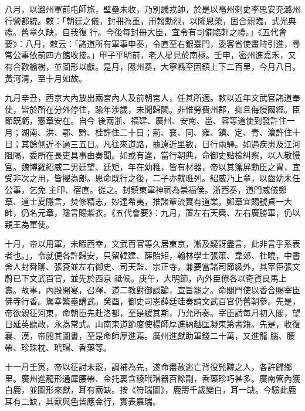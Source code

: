 \begin{pinyinscope}
 八月，以潞州軍前屯師旅，壁壘未收，乃別議戎帥，於是以亳州刺史李思安充潞州行營都統。敕：「朝廷之儀，封冊為重，用報勳烈，以隆恩榮，固合親臨，式光典禮。舊章久缺，自我復
 行。今後每封冊大臣，宜令有司備臨軒之禮。」《五代會要》：八月，敕云：「諸道所有軍事申奏，令直至右銀臺門，委客省使畫時引進，尋常公事依前四方館收接。」甲子平明前，老人星見於南極。壬申，密州進嘉禾，又有合歡榆樹，並圖形以獻。是月，隰州奏，大寧縣至固鎮上下二百里，今月八日，黃河清，至十月如故。



 九月辛丑，西京大內放出兩宮內人及前朝宮人，任其所適。敕以近年文武官諸道奉使，皆於所在分外停住，踰年涉歲，未聞歸闕。非惟勞費州郡，抑且侮慢國經。臣節既虧，憲章安在。自今
 後兩浙、福建、廣州、安南、邕、容等道使到發許住一月；湖南、洪、鄂、黔、桂許住二十日；荊、襄、同、雍、鎮、定、青、滄許住十日；其餘側近不過三五日。凡往來道路，據遠近里數，日行兩驛。如遇疾患及江河阻隔，委所在長吏具事由奏聞。如或有違，當行朝典，命御史點檢糾察，以人敬慢官。魏博羅紹威二男廷望、廷矩，年在幼稚，皆有材器，帝以其籓屏勳臣之胄，宜受非次之用，皆擢為郎。恩命既行之後，二子亦就班列。紹威乃上章，以齒幼未任公事，乞免
 主印、宿直。從之。封鎮東軍神祠為崇福侯。浙西奏，道門威儀鄭章、道士夏隱言，焚修精志，妙達希夷，推諸輩流實有道業。鄭章宜賜號貞一大師，仍名元章，隱言賜紫衣。《五代會要》：九月，置左右天興、左右廣勝軍，仍以親王為軍使。



 十月，帝以用軍，未暇西幸，文武百官等久居東京，漸及疑訝盡言，此非言乎系表者也。」，令就便各許歸安，只留韓建、薛貽矩，翰林學士張策、韋郊、杜曉，中書舍人封舜聊、張袞並左右御史、司天監、宗正寺，兼要當諸司節級外，其宰臣張文蔚已下文武百官，並先於西京
 祗候。庚午，大明節，內外臣僚各以奇貨良馬上壽。故事，內殿開宴，召釋、道二教對御談論，宣旨罷之。命閣門使以香合賜宰臣佛寺行香。駕幸繁臺講武。癸酉，御史司憲薛廷珪奏請文武百官仍舊朝參。先是，帝欲親征河東，命朝臣先赴洛都，至是緩其期，乃允所奏。宰臣請每月初入閣，望日延英聽政，永為常式。山南東道節度使楊師厚進納越匡凝東第書籍。先是，收復襄、漢，帝閱其圖書，至是命師厚進焉。廣州進獻助軍錢二十萬，又進龍
 腦、腰帶、珍珠枕、玳瑁、香藥等。



 十一月壬寅，帝以征討未罷，調補為先，遂命盡赦逃亡背役髡黥之人，各許歸鄉里。廣州進龍形通犀腰帶、金托裏含稜玳瑁器百餘副，香藥珍巧甚多。廣南管內獲白鹿，並圖形來獻，耳有兩缺。按《符瑞圖》，鹿壽千歲變白，耳一缺。今驗此鹿耳有二缺，其獸與色皆應金行，實表嘉瑞。




\end{pinyinscope}
